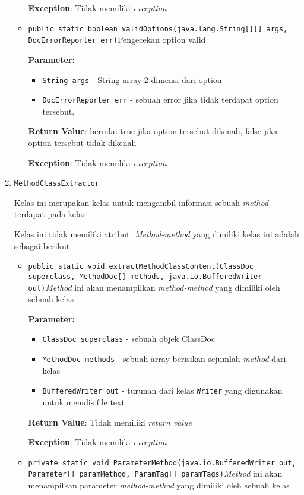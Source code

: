 \documentclass{article}
\begin{document}
\begin{enumerate}
\begin{itemize}
\textbf{Exception}: Tidak memiliki \textit{exception}

\item \texttt{public static boolean validOptions(java.lang.String[][] args, DocErrorReporter err)}Pengecekan option valid

\textbf{Parameter:}
\begin{itemize}
\item \texttt{String args} - 
String array 2 dimensi dari option
\item \texttt{DocErrorReporter err} - 
sebuah error jika tidak terdapat option tersebut.
\end{itemize}
\textbf{Return Value}: bernilai true jika option tersebut dikenali, false jika option
 tersebut tidak dikenali

\textbf{Exception}: Tidak memiliki \textit{exception}

\end{itemize}
\item \texttt{MethodClassExtractor}

Kelas ini merupakan kelas untuk mengambil informasi sebuah \textit{method}
 terdapat pada kelas

Kelas ini tidak memiliki atribut. \textit{Method-method} yang dimiliki kelas ini adalah sebagai berikut.
\begin{itemize}
\item \texttt{public static void extractMethodClassContent(ClassDoc superclass, MethodDoc[] methods, java.io.BufferedWriter out)}\textit{Method} ini akan menampilkan \textit{method-method} yang dimiliki
 oleh sebuah kelas

\textbf{Parameter:}
\begin{itemize}
\item \texttt{ClassDoc superclass} - 
sebuah objek ClassDoc
\item \texttt{MethodDoc methods} - 
sebuah array berisikan sejumlah \textit{method} dari kelas
\item \texttt{BufferedWriter out} - 
turunan dari kelas \texttt{Writer} yang digunakan untuk menulis
                   file text
\end{itemize}
\textbf{Return Value}: Tidak memiliki \textit{return value}

\textbf{Exception}: Tidak memiliki \textit{exception}

\item \texttt{private static void ParameterMethod(java.io.BufferedWriter out, Parameter[] paramMethod, ParamTag[] paramTags)}\textit{Method} ini akan menampilkan parameter \textit{method-method} yang dimiliki
 oleh sebuah kelas


\end{itemize}
\end{enumerate}
\end{document}
